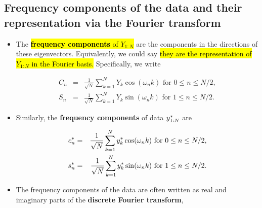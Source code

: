 \documentclass[]{article}
\begin{document}
\subsection{Frequency components of the data and their representation
via the Fourier
transform}\label{frequency-components-of-the-data-and-their-representation-via-the-fourier-transform}

\begin{itemize}
\item
  The \hl{\textbf{frequency components} of $Y_{1:N}$} are the components in
  the directions of these eigenvectors. Equivalently, we could say \hl{they
  are the representation of $Y_{1:N}$ in the Fourier basis.}
  Specifically, we write

  \begin{eqnarray}
  C_n &=& \frac{1}{\sqrt{N}}\sum_{k=1}^N Y_k\cos(\omega_n k) \mbox{ for $0\le n\le N/2$},
  \\
  S_n &=& \frac{1}{\sqrt{N}}\sum_{k=1}^N Y_k\sin(\omega_n k) \mbox{ for $1\le n\le N/2$}.
  \end{eqnarray}
\item
  Similarly, the \textbf{frequency components} of data
  \(y_{1:N}^*\) are

  \begin{eqnarray}
  c_n^* &=& \frac{1}{\sqrt{N}}\sum_{k=1}^N y_k^*\cos(\omega_n k) \mbox{ for $0\le n\le N/2$},
  \\
  s_n^* &=& \frac{1}{\sqrt{N}}\sum_{k=1}^N y_k^*\sin(\omega_n k) \mbox{ for $1\le n\le N/2$}.
  \end{eqnarray}
\item
  The frequency components of the data are often written as real and
  imaginary parts of the \textbf{discrete Fourier transform},


\end{itemize}
\end{document}

